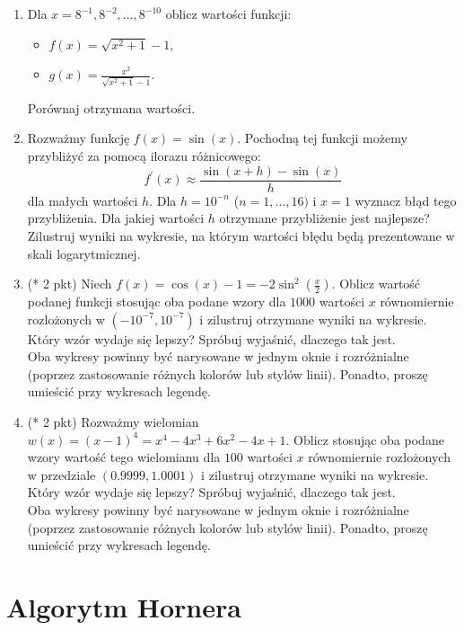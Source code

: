 \documentclass[10pt,a4paper]{article}
\begin{document}
\begin{enumerate}
\item Dla $x=8^{-1},8^{-2},\ldots,8^{-10}$ oblicz wartości funkcji:
\begin{itemize}
	\item $f(x)=\sqrt{x^2+1}-1$,
	\item $g(x)=\frac{x^2}{\sqrt{x^2+1}-1}$.
\end{itemize}
Porównaj otrzymana wartości.

\item Rozważmy funkcję $f(x)=\sin(x)$. Pochodną tej funkcji możemy przybliżyć za pomocą ilorazu różnicowego:
$$f^{'}(x)\approx \frac{\sin(x+h)-\sin(x)}{h}$$ 
dla małych wartości $h$. Dla $h=10^{-n}$ ($n=1,\ldots,16)$ i $x=1$ wyznacz błąd tego przybliżenia. Dla jakiej wartości $h$ otrzymane przybliżenie jest najlepsze? Zilustruj wyniki na wykresie, na którym wartości błędu będą prezentowane w skali logarytmicznej.

\item (* 2 pkt) Niech $f(x)=\cos (x)-1=-2\sin^2(\frac{x}{2})$. Oblicz wartość podanej funkcji stosując oba podane wzory dla $1000$ wartości $x$ równomiernie rozlożonych w $ (-10^{-7},10^{-7})$ i zilustruj otrzymane wyniki na wykresie. Który wzór wydaje się lepszy? Spróbuj wyjaśnić, dlaczego tak jest.\\
Oba wykresy powinny być narysowane w jednym oknie i rozróżnialne (poprzez zastosowanie różnych kolorów lub stylów linii). Ponadto, proszę umieścić przy wykresach legendę.

\item (* 2 pkt) Rozważmy wielomian $w(x)=(x-1)^4=x^4-4x^3+6x^2-4x+1$. Oblicz stosując oba podane wzory wartość tego wielomianu dla $100$ wartości $x$ równomiernie rozłożonych w przedziale $(0.9999,1.0001)$ i zilustruj otrzymane wyniki na wykresie. Który wzór wydaje się lepszy? Spróbuj wyjaśnić, dlaczego tak jest.\\
Oba wykresy powinny być narysowane w jednym oknie i rozróżnialne (poprzez zastosowanie różnych kolorów lub stylów linii). Ponadto, proszę umieścić przy wykresach legendę.
\end{enumerate}

\section*{Algorytm Hornera}
\end{document}
